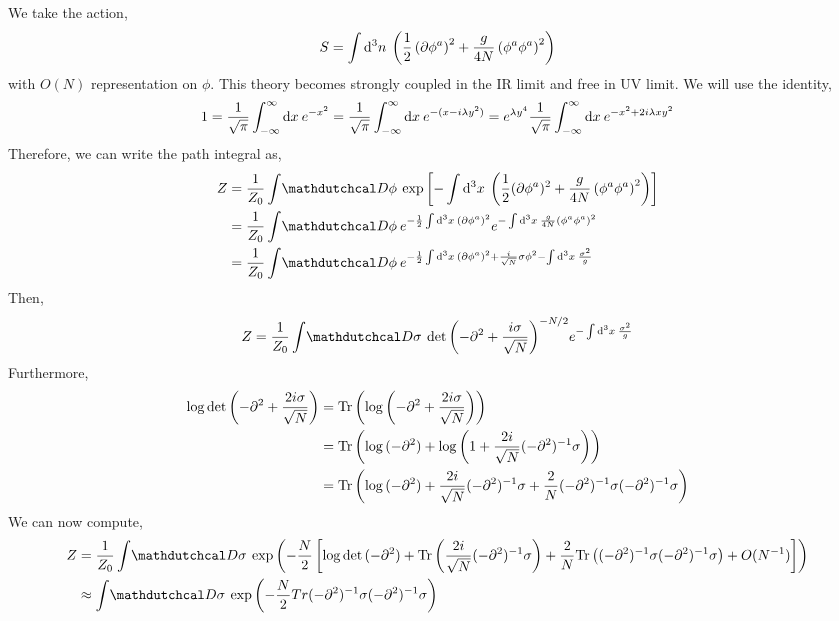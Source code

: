 \documentclass[12pt]{extarticle}
\begin{document}
We take the action,
\[ S = \int \mathrm{d}^{3} n \: \left( \frac{1}{2} \left( \partial \phi^a \right)^2 + \frac{g}{4 N} \left( \phi^a \phi^a \right)^2 \right) \]
with $O(N)$ representation on $\phi$.
This theory becomes strongly coupled in the IR limit and free in UV limit. We will use the identity,
\begin{align*}
1 = \frac{1}{\sqrt{\pi}} \int_{-\infty}^\infty \mathrm{d}x \: e^{-x^2} = \frac{1}{\sqrt{\pi}} \int_{-\infty}^\infty \mathrm{d}x \: e^{-(x - i \lambda y^2)} = e^{\lambda y^4} \frac{1}{\sqrt{\pi}} \int_{-\infty}^{\infty} \mathrm{d}x \: e^{-x^2 + 2 i \lambda x y^2}
\end{align*}
Therefore, we can write the path integral as,
\begin{align*}
Z & = \frac{1}{Z_0} \int \pathd{\phi} \exp{\left[- \int \dn{3}{x} \left( \frac{1}{2} (\partial \phi^a)^2 + \frac{g}{4 N} \left( \phi^a \phi^a \right)^2 \right) \right]}
\\
& = \frac{1}{Z_0} \int \pathd{\phi} e^{- \frac{1}{2} \int \dn{3}{x} \left( \partial \phi^a \right)^2} e^{- \int \dn{3}{x} \frac{g}{4 N} \left( \phi^a \phi^a \right)^2 }
\\
& = \frac{1}{Z_0} \int \pathd{\phi} e^{- \frac{1}{2} \int \dn{3}{x} \left( \partial \phi^a \right)^2 + \frac{i}{\sqrt{N}} \sigma \phi^2 - \int \dn{3}{x} \frac{\sigma^2}{g} } 
\end{align*} 
Then,
\begin{align*}
Z = \frac{1}{Z_0} \int \pathd{\sigma} \det{\left( - \partial^2 + \frac{ i \sigma }{\sqrt{N}} \right) }^{-N/2} e^{- \int \dn{3}{x} \frac{\sigma^2}{g}} 
\end{align*}
Furthermore,
\begin{align*}
\log{\det{\left( - \partial^2 + \frac{ 2i \sigma }{\sqrt{N}} \right) }} &= \mathrm{Tr}\left( \log{\left( - \partial^2 + \frac{2i \sigma}{\sqrt{N}} \right)} \right)
\\
& = \mathrm{Tr}\left( \log{(-\partial^2)} + \log{\left( 1 + \frac{2i}{\sqrt{N}} (- \partial^2)^{-1} \sigma \right)} \right)
\\
& = \mathrm{Tr}\left( \log{(- \partial^2 )} + \frac{2 i}{\sqrt{N}} (-\partial^2)^{-1} \sigma + \frac{2}{N} (-\partial^2)^{-1} \sigma (-\partial^2)^{-1} \sigma \right) 
\end{align*}
We can now compute,
\begin{align*}
Z & = \frac{1}{Z_0} \int \pathd{\sigma} \exp{\left( - \frac{N}{2} \left[ \log{\det{(-\partial^2)}} + \Tr{\frac{2 i}{\sqrt{N}} (-\partial^2)^{-1} \sigma} + \frac{2}{N} \Tr{( - \partial^2)^{-1} \sigma (-\partial^2)^{-1} \sigma} + O(N^{-1}) \right] \right)}
\\
& \approx \int \pathd{\sigma} \exp{\left(- \frac{N}{2} Tr{( - \partial^2)^{-1} \sigma (-\partial^2)^{-1} \sigma} \right)}
\end{align*}
\end{document}
